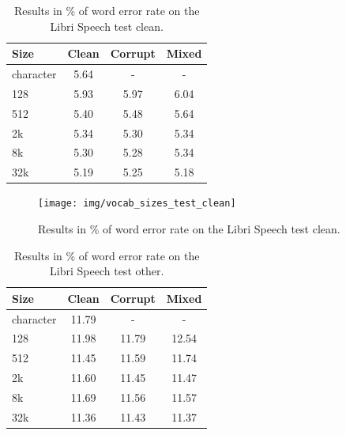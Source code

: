 \begin{table}[p]
	\centering
	\begin{tabular}{l|ccc}
		\bf Size & \bf Clean & \bf Corrupt & \bf Mixed \\
		\hline
		
		character    &    5.64    &    -    &    - \\
		128    &    5.93    &    5.97    &    6.04 \\
		512    &    5.40    &    5.48    &    5.64 \\
		2k    &    5.34    &    5.30    &    5.34 \\
		8k    &    5.30    &    5.28    &    5.34 \\
		32k    &    5.19    &    5.25    &    5.18 \\
		
	\end{tabular}
	
	\caption{Results in \% of word error rate on the Libri Speech test clean.}
	\label{tab:results_vocabularies_libri_clean}
\end{table}

\begin{figure}[p]
	\centering
	\texttt{[image: img/vocab\_sizes\_test\_clean]}
	\caption{Results in \% of word error rate on the Libri Speech test clean.}
	\label{fig:vocab_sizes_test_clean}
\end{figure}

\begin{table}[p]
	\centering
	\begin{tabular}{l|ccc}
		\bf Size & \bf Clean & \bf Corrupt & \bf Mixed \\
		\hline
		character    &    11.79    &    -    &    - \\
		128    &    11.98    &    11.79    &    12.54\\
		512    &    11.45    &    11.59    &    11.74\\
		2k    &    11.60    &    11.45    &    11.47\\
		8k    &    11.69    &    11.56    &    11.57\\
		32k    &    11.36    &    11.43    &    11.37\\
		
	\end{tabular}
	
	\caption{Results in \% of word error rate on the Libri Speech test other.}
	\label{tab:results_vocabularies_libri_other}
\end{table}

